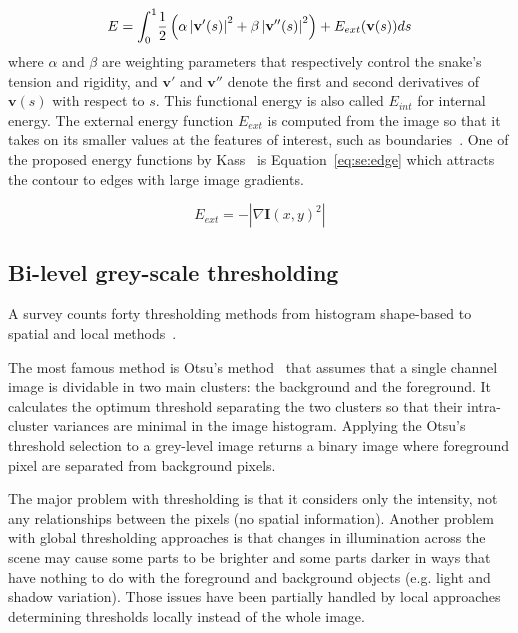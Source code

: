 \begin{equation}\label{eq:se:energy1}
  E = \int_0^1 \! \frac{1}{2} \left( \alpha \left|\mathbf{v}'(s) \right|^2 + \beta \left| \mathbf{v}''(s) \right|^2 \right) + E_{ext}(\mathbf{v}(s))ds\\
\end{equation}
where $\alpha$ and $\beta$ are weighting parameters that respectively control the snake's tension and rigidity, and $\mathbf{v}'$ and $\mathbf{v}''$ denote the first and second derivatives of $\mathbf{v}(s)$ with respect to $s$. This functional energy is also called $E_{int}$ for internal energy.
The external energy function $E_{ext}$ is computed from the image so that it takes on its smaller values at the features of interest, such as boundaries~\cite{Xu1998}.
One of the proposed energy functions by Kass~\cite{Kass1988} is Equation~\ref{eq:se:edge} which attracts the contour to edges with large image gradients. 

\begin{equation}\label{eq:se:edge}
  E_{ext} = -|\nabla \mathbf{I}(x,y)^2|
\end{equation}


\subsection{Bi-level grey-scale thresholding} %
\label{sub:ap:bi_threshold}
A survey counts forty thresholding methods from histogram shape-based to spatial and local methods~\cite{sezgin2004survey}.
 
The most famous method is Otsu's method~\cite{otsu79} that assumes that a single channel image is dividable in two main clusters: the background and the foreground.
It calculates the optimum threshold separating the two clusters so that their intra-cluster variances are minimal in the image histogram.
Applying the Otsu's threshold selection to a grey-level image returns a binary image where foreground pixel are separated from background pixels.

The major problem with thresholding is that it considers only the intensity, not any relationships between the pixels (no spatial information).
Another problem with global thresholding approaches is that changes in illumination across the scene may cause some parts to be brighter and some parts darker in ways that have nothing to do with the foreground and background objects (e.g. light and shadow variation).
Those issues have been partially handled by local approaches determining thresholds locally instead of the whole image.%


